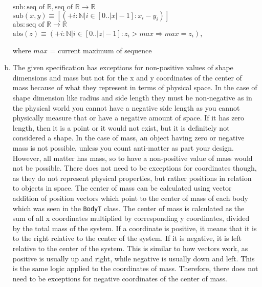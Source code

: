 \documentclass[12pt]{article}
\begin{document}
\begin{enumerate}[a)]
\noindent $\text{sub}: \text{seq of } \mathbb{R}, \text{seq of } \mathbb{R} \rightarrow 
\mathbb{R}$\\
\noindent $\text{sub}(x, y) \equiv [(+ i: \mathbb{N} | i \in [0..|x|-1] :
x_i - y_i)]$\\

\noindent $\text{abs}: \text{seq of } \mathbb{R} \rightarrow \mathbb{R}$\\
\noindent $\text{abs}(z) \equiv (+ i: \mathbb{N} | i \in [0..|z|-1] :
z_i > max \Rightarrow max = z_i)$,

where $max$ = current maximum of sequence

\newpage

\item The given specification has exceptions for non-positive values of shape dimensions and mass 
but not for the x and y coordinates of the center of mass because of what they represent in terms 
of physical space. In the case of shape dimension like radius and side length they must be 
non-negative as in the physical world you cannot have a negative side length as you cannot 
physically measure that or have a negative amount of space. If it has zero length, then it is a 
point or it would not exist, but it is definitely not considered a shape. In the case of mass, an 
object having zero or negative mass is not possible, unless you count anti-matter as part your 
design. However, all matter has mass, so to have a non-positive value of mass would not be 
possible. There does not need to be exceptions for coordinates though, as they do not represent 
physical properties, but rather positions in relation to objects in space. The center of mass can 
be calculated using vector addition of position vectors which point to the center of mass of each 
body which was seen in the \verb|BodyT| class. The center of mass is calculated as the sum of all 
x coordinates multiplied by corresponding y coordinates, divided by the total mass of the system. 
If a coordinate is positive, it means that it is to the right relative to the center of the 
system. If it is negative, it is left relative to the center of the system. This is similar to 
how vectors work, as positive is usually up and right, while negative is usually down and left. 
This is the same logic applied to the coordinates of mass. Therefore, there does not need to be 
exceptions for negative coordinates of the center of mass. 


\end{enumerate}
\end{document}
